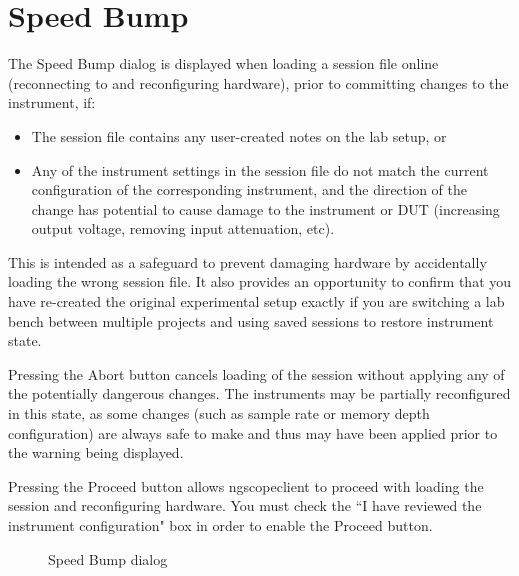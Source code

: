 
\section{Speed Bump}
\label{dlg:speedbump}

The Speed Bump dialog is displayed when loading a session file online (reconnecting to and reconfiguring hardware),
prior to committing changes to the instrument, if:

\begin{itemize}
\item The session file contains any user-created notes on the lab setup, or
\item Any of the instrument settings in the session file do not match the current configuration of the corresponding
instrument, and the direction of the change has potential to cause damage to the instrument or DUT (increasing output
voltage, removing input attenuation, etc).
\end{itemize}

This is intended as a safeguard to prevent damaging hardware by accidentally loading the wrong session file. It also
provides an opportunity to confirm that you have re-created the original experimental setup exactly if you are
switching a lab bench between multiple projects and using saved sessions to restore instrument state.

Pressing the Abort button cancels loading of the session without applying any of the potentially dangerous changes.
The instruments may be partially reconfigured in this state, as some changes (such as sample rate or memory depth
configuration) are always safe to make and thus may have been applied prior to the warning being displayed.

Pressing the Proceed button allows ngscopeclient to proceed with loading the session and reconfiguring hardware. You
must check the ``I have reviewed the instrument configuration" box in order to enable the Proceed button.

\begin{figure}[H]
\centering
{}
\caption{Speed Bump dialog}
\label{speedbump}
\end{figure}

